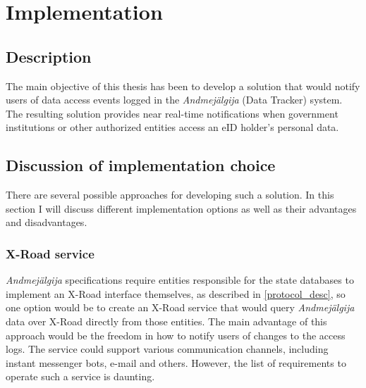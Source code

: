 \section{Implementation}

\subsection{Description}

The main objective of this thesis has been to develop a solution that would notify users of data access events logged in the \textit{Andmejälgija} (Data Tracker) system. The resulting solution provides near real-time notifications when government institutions or other authorized entities access an eID holder's personal data.

\subsection{Discussion of implementation choice}
There are several possible approaches for developing such a solution. In this section I will discuss different implementation options as well as their advantages and disadvantages.

\subsubsection{X-Road service}
\textit{Andmejälgija} specifications require entities responsible for the state databases to implement an X-Road interface themselves, as described in \ref{protocol_desc}, so one option would be to create an X-Road service that would query \textit{Andmejälgija} data over X-Road directly from those entities. The main advantage of this approach would be the freedom in how to notify users of changes to the access logs. The service could support various communication channels, including instant messenger bots, e-mail and others. However, the list of requirements to operate such a service is daunting. 

